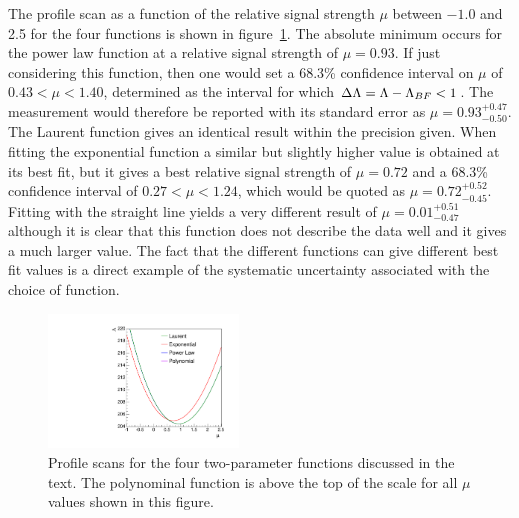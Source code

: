 The profile scan as a function of the relative signal strength $\mu$
between $-1.0$ and 2.5
for the four functions is shown in
figure~\ref{fig:functions:profiles}.
The absolute minimum occurs for the power law function at a relative signal 
strength of $\mu = 0.93$. If just considering this function,
then one would set a 68.3\% confidence interval on $\mu$ of  
$0.43 < \mu < 1.40 $, determined as the interval for which $\Delta{\rm \ensuremath{\Lambda}} = \Lambda - \Lambda_{BF} < 1$. 
The measurement would therefore be reported with its standard error as $\mu=0.93^{+0.47}_{-0.50}$. The Laurent function gives an identical result within the precision given.
When fitting the exponential function a similar but slightly higher
\nll value is obtained
at its best fit, but it gives a best relative signal strength of $\mu = 0.72$
and a 68.3\% confidence interval of
$0.27 < \mu < 1.24 $, which would be quoted as $\mu = 0.72^{+0.52}_{-0.45}$.
Fitting with the straight line yields a very different result of 
$\mu = 0.01^{+0.51}_{-0.47}$ 
although it is clear that this function does not describe the data well and it
gives a much larger \nll value.
The fact that the different functions can give different best fit values
is a direct example of the systematic uncertainty associated
with the choice of function.
%
\begin{figure}[tbp]
\centering
\includegraphics[width=0.45\textwidth]{functions/Profiles.pdf}
\caption{Profile \nll scans for the four two-parameter
functions discussed in the text.
The polynominal function is above the top of the \nll scale for all 
$\mu$ values shown in this figure. }
\label{fig:functions:profiles}
\end{figure}

